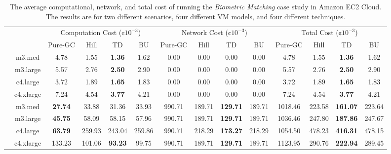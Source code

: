 \documentclass{llncs}
\begin{document}
\begin{table*}[hbt]
	\scriptsize
	\centering
	\begin{tabular}{|c|c|c|c|c|c|c|c|c|c|c|c|c|c|}
	
	\cline{3-14}
	\multicolumn{2}{c|}{} & \multicolumn{4}{|c|}{Computation Cost ($\cent10^{-3}$)} & \multicolumn{4}{|c|}{Network Cost ($\cent10^{-3}$)}& \multicolumn{4}{|c|}{Total Cost ($\cent10^{-3}$)} \\
	\cline{3-14}
	\multicolumn{2}{c|}{} & Pure-GC & Hill & TD & BU & Pure-GC & Hill & TD & BU & Pure-GC & Hill & TD & BU \\
	\hline
	
	\parbox[t]{2mm}{} 
 & m3.med 		& 4.78 & 1.55 & \textbf{1.36} & 1.62 & 0.00 & 0.00 & 0.00 & 0.00 & 4.78 & 1.55 & \textbf{1.36} & 1.62 \\
 & m3.large 	& 5.57 & 2.76 & \textbf{2.50} & 2.90 & 0.00 & 0.00 & 0.00 & 0.00 & 5.57 & 2.76 & \textbf{2.50} & 2.90 \\
 & c4.large 	& 3.72 & 1.89 & \textbf{1.65} & 1.83 & 0.00 & 0.00 & 0.00 & 0.00 & 3.72 & 1.89 & \textbf{1.65} & 1.83 \\
 & c4.xlarge 	& 7.24 & 4.54 & \textbf{3.77} & 4.21 & 0.00 & 0.00 & 0.00 & 0.00 & 7.24 & 4.54 & \textbf{3.77} & 4.21 \\		
	\hline		
	\parbox[t]{2mm}{} 
 & m3.med 		& \textbf{27.74} 	& 33.88 	& 31.36 	& 33.93 	& 990.71 & 189.71 & \textbf{129.71} & 189.71 & 1018.46 & 223.58 & \textbf{161.07} & 223.64 \\
 & m3.large 	& \textbf{45.75} 	& 58.09 	& 58.15 	& 57.96 	& 990.71 & 189.71 & \textbf{129.71} & 189.71 & 1036.46 & 247.80 & \textbf{187.86} & 247.67 \\ 
 & c4.large 	& \textbf{63.79} 	& 259.93 	& 243.04 	& 259.86 	& 990.71 & 218.29 & \textbf{173.27} & 218.29 & 1054.50 & 478.23 & \textbf{416.31} & 478.15 \\
 & c4.xlarge 	& 133.23 	& 101.06 	& \textbf{93.23} 	& 99.75 	& 990.71 & 189.71 & \textbf{129.71} & 189.71 & 1123.95 & 290.76 & \textbf{222.94} & 289.45 \\		
	\hline
	\end{tabular}

	\caption{The average computational, network, and total cost of running the \emph{Biometric Matching} case study in Amazon EC2 Cloud. The results are for two different scenarios, four different VM models, and four different techniques.}
	\label{table:case:bio:cost}
\end{table*}
\end{document}
